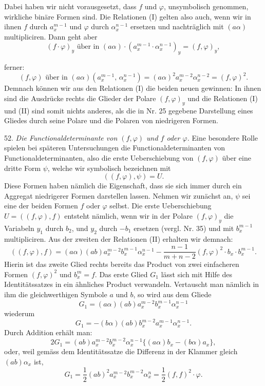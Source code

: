 Dabei haben wir nicht vorausgesetzt, dass $f$ und $\varphi$, unsymbolisch genommen, wirkliche binäre Formen sind. Die Relationen (I) gelten also auch, wenn wir in ihnen $f$ durch $a_x^{m-1}$ und $\varphi$ durch $\alpha_x^{n-1}$ ersetzen und nachträglich mit $(a\alpha)$ multipliciren. Dann geht aber
\[
(f\cdot\varphi)_y \text{ über in } (a\alpha)\cdot(a_x^{m-1}\cdot\alpha_x^{n-1})_y = (f,\varphi)_y,
\]



ferner:
\[
(f,\varphi) \text{ über in } (a\alpha)(a_x^{m-1},\,\alpha_x^{n-1}) = (a\alpha)^2a_x^{m-2}\alpha_x^{n-2} = (f,\varphi)^2.
\]
Demnach können wir aus den Relationen (I) die beiden neuen gewinnen:
In ihnen sind die Ausdrücke rechts die Glieder der Polare $(f,\varphi)_y$ und die Relationen (I) und (II) sind somit nichts anderes, als die in Nr. 25 gegebene Darstellung eines Gliedes durch seine Polare und die Polaren von niedrigeren Formen.

52. \textit{Die Functionaldeterminante von $(f,\varphi)$ und $f$ oder $\varphi$.} Eine besondere Rolle spielen bei späteren Untersuchungen die Functionaldeterminanten von Functionaldeterminanten, also die erste Ueberschiebung von $(f,\varphi)$ über eine dritte Form $\psi$, welche wir symbolisch bezeichnen mit
\[
((f,\varphi),\psi) = U.
\]
Diese Formen haben nämlich die Eigenschaft, dass sie sich immer durch ein Aggregat niedrigerer Formen darstellen lassen. Nehmen wir zunächst an, $\psi$ sei eine der beiden Formen $f$ oder $\varphi$ selbst. Die erste Ueberschiebung $U = ((f,\varphi),f)$ entsteht nämlich, wenn wir in der Polare $(f,\varphi)_y$ die Variabeln $y_1$ durch $b_2$, und $y_2$ durch $-b_1$ ersetzen (vergl. Nr. 35) und mit $b_x^{m-1}$ multipliciren. Aus der zweiten der Relationen (II) erhalten wir demnach:
\[
((f,\varphi),f) = (a\alpha)(ab)a_x^{m-2}b_x^{m-1}\alpha_x^{n-1} - \frac{n-1}{m+n-2}(f,\varphi)^2\cdot b_x\cdot b_x^{m-1}.
\]
Hierin ist das zweite Glied rechts bereits das Product von zwei einfacheren Formen $(f,\varphi)^2$ und $b_x^m = f$. Das erste Glied $G_1$ lässt sich mit Hilfe des Identitätssatzes in ein ähnliches Product verwandeln. Vertauscht man nämlich in ihm die gleichwerthigen Symbole $a$ und $b$, so wird aus dem Gliede
\[
G_1 = (a\alpha)(ab)a_x^{m-2}b_x^{m-1}\alpha_x^{n-1}
\]
wiederum
\[
G_1 = -(b\alpha)(ab)b_x^{m-2}a_x^{m-1}\alpha_x^{n-1}.
\]
Durch Addition erhält man:
\[
2G_1 = (ab)a_x^{m-2}b_x^{m-2}\alpha_x^{n-1}\{(a\alpha)b_x - (b\alpha)a_x\},
\]
oder, weil gemäss dem Identitätssatze die Differenz in der Klammer gleich $(ab)\alpha_x$ ist,
\[
G_1 = \frac{1}{2}(ab)^2a_x^{m-2}b_x^{m-2}\alpha_x^n = \frac{1}{2}(f,f)^2\cdot\varphi.
\]


